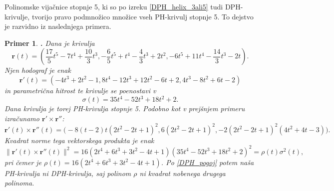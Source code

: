 \documentclass[12pt,a4paper,twoside]{article}
\theoremstyle{definition} %
\theoremstyle{plain} %
\theoremstyle{primerstyle}
\newtheorem{primer}[definicija]{Primer}
\numberwithin{equation}{section}  %
\newcommand{\rV}{\mathbf{r}}
\DeclareMathOperator{\st}{st}
\begin{document}
Polinomske vijačnice stopnje 5, ki so po izreku \ref{DPH_helix_3ali5} tudi DPH-krivulje, tvorijo pravo podmnožico množice vseh PH-krivulj stopnje 5. To dejstvo je razvidno iz naslednjega primera.
\begin{primer}
	\textbf{.} Dana je krivulja $$\rV(t)=\left(\frac{17}{5}t^5-7t^4+\frac{10}{3}t^3,-\frac{6}{5}t^5+t^4-\frac{4}{3}t^3+2t^2,-6t^5+11t^4-\frac{14}{3}t^3-2t\right)\!.$$ Njen hodograf je enak $$\rV'(t)=(-4t^3+2t^2-1,8t^4-12t^3+12t^2-6t+2,4t^3-8t^2+6t-2)$$ in parametrična hitrost te krivulje se poenostavi v
	$$\sigma(t)=35t^4-52t^3+18t^2+2.$$
	Dana krivulja je torej PH-krivulja stopnje 5. Podobno kot v prejšnjem primeru izračunamo $\rV'\times\rV''$:
	$$\rV'(t)\times\rV''(t)=\big(-8(t-2)t(2t^2-2t+1)^2,6(2t^2-2t+1)^2,-2(2t^2-2t+1)^2 (4t^2+4t-3)\big).$$
	Kvadrat norme tega vektorskega produkta je enak
	$$\lVert\rV'(t)\times\rV''(t)\rVert^2=16(2t^4+6t^3+3t^2-4t+1)(35t^4-52t^3+18t^2+2)^2=\rho(t)\sigma^2(t),$$
	pri čemer je $\rho(t)=16(2t^4+6t^3+3t^2-4t+1)$. Po \eqref{DPH_pogoj} potem naša PH-krivulja ni DPH-krivulja, saj polinom $\rho$ ni kvadrat nobenega drugega polinoma.
\end{primer}
\end{document}

